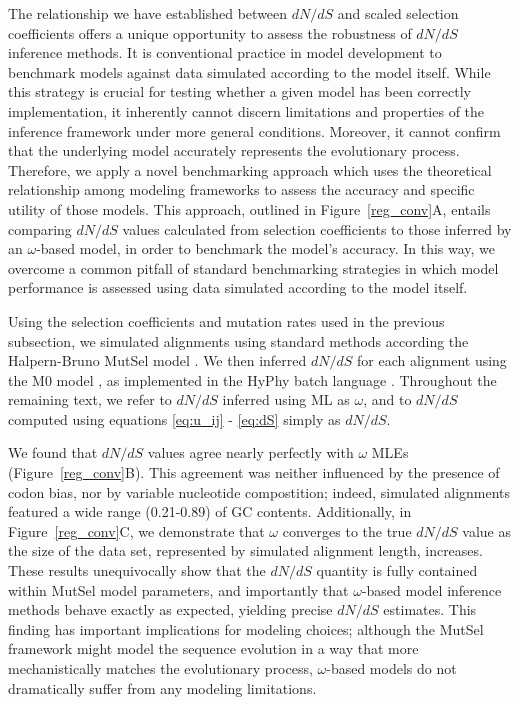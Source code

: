 \documentclass[11pt]{article}
\begin{document}
The relationship we have established between $dN/dS$ and scaled selection coefficients offers a unique opportunity to assess the robustness of $dN/dS$ inference methods. It is conventional practice in model development to benchmark models against data simulated according to the model itself. While this strategy is crucial for testing whether a given model  has been correctly implementation, it inherently cannot discern limitations and properties of the inference framework under more general conditions. Moreover, it cannot confirm that the underlying model accurately represents the evolutionary process. Therefore, we apply a novel benchmarking approach which uses the theoretical relationship among modeling frameworks to assess the accuracy and specific utility of those models. This approach, outlined in Figure~\ref{reg_conv}A, entails comparing $dN/dS$ values calculated from selection coefficients to those inferred by an $\omega$-based model, in order to benchmark the model's accuracy. In this way, we overcome a common pitfall of standard benchmarking strategies in which model performance is assessed using data simulated according to the model itself.

Using the selection coefficients and mutation rates used in the previous subsection, we simulated alignments using standard methods \cite{Yang2006} according the Halpern-Bruno MutSel model \cite{HalpernBruno1998}. We then inferred $dN/dS$ for each alignment using the M0 model \cite{GoldmanYang1994,Yangetal2000}, as implemented in the HyPhy batch language \cite{KosakovskyPondetal2005}. Throughout the remaining text, we refer to $dN/dS$ inferred using ML as $\omega$, and to $dN/dS$ computed using equations \eqref{eq:u_ij} - \eqref{eq:dS} simply as $dN/dS$. 

We found that $dN/dS$ values agree nearly perfectly with $\omega$ MLEs (Figure~\ref{reg_conv}B). This agreement was neither influenced by the presence of codon bias, nor by variable  nucleotide compostition; indeed, simulated alignments featured a wide range (0.21-0.89) of GC contents. Additionally, in Figure~\ref{reg_conv}C, we demonstrate that $\omega$ converges to the true $dN/dS$ value as the size of the data set, represented by simulated alignment length, increases. These results unequivocally show that the $dN/dS$ quantity is fully contained within MutSel model parameters, and importantly that $\omega$-based model inference methods behave exactly as expected, yielding precise $dN/dS$ estimates. This finding has important implications for modeling choices; although the MutSel framework might model the sequence evolution in a way that more mechanistically matches the evolutionary process, $\omega$-based models do not dramatically suffer from any modeling limitations. 
\end{document}
